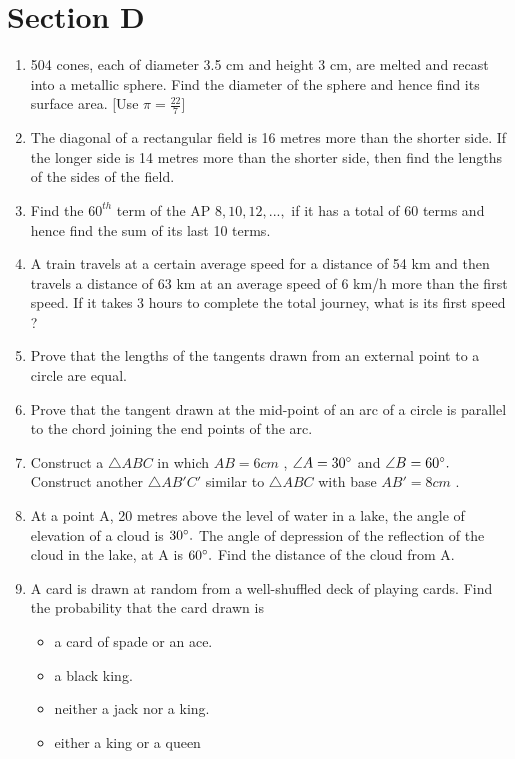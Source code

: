 \documentclass[journal,12pt,twocolumn]{IEEEtran}
\renewcommand\thesection{\arabic{section}}
\begin{document}
\section{Section D}
\renewcommand{\theequation}{\theenumi}
\begin{enumerate}[label=\thesection.\arabic*.,ref=\thesection.\theenumi]
 \item 504 cones, each of diameter 3.5 cm and height 3 cm, are melted and recast into a metallic sphere. Find the diameter of the sphere and hence find its surface area. [Use $\pi=\frac{22}{7}$]
 \item The diagonal of a rectangular field is 16 metres more than the shorter side. If the longer side is 14 metres more than the shorter side, then find the lengths of the sides of the field.
 \item Find the $60^{th}$ term of the AP $8, 10, 12, ...,$ if it has a total of 60 terms and hence find the sum of its last 10 terms.
 \item A train travels at a certain average speed for a distance of 54 km and then travels a distance of 63 km at an average speed of 6 km/h more than the first speed. If it takes 3 hours to complete the total journey, what is its first speed ?
 \item Prove that the lengths of the tangents drawn from an external point to a circle are equal.
 \item Prove that the tangent drawn at the mid-point of an arc of a circle is parallel to the chord joining the end points of the arc.
 \item  Construct a $\triangle ABC $ in which $ AB = 6 cm $ , $\angle A = 30\degree $ and $\angle B = 60\degree.$ Construct another $\triangle AB'C' $ similar to $\triangle ABC $ with base $AB' = 8 cm $ .
 \item At a point A, 20 metres above the level of water in a lake, the angle of elevation of a cloud is $30 \degree.$ The angle of depression of the reflection of the cloud in the lake, at A is $60\degree .$ Find the distance of the cloud from A.
 \item A card is drawn at random from a well-shuffled deck of playing cards. Find the probability that the card drawn is
 \begin{itemize}
     \item a card of spade or an ace.
     \item a black king. 
     \item neither a jack nor a king.
     \item either a king or a queen

\end{itemize}
\end{enumerate}
\end{document}
